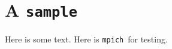 \documentclass{article}
\def\MPI/{MPI}
\def\mpich{{\tt mpich}}
\begin{document}
\section{A {\tt sample}}\label{Sample-doc}

Here is some text.  Here is \mpich\ for testing.
%
%
%
\end{document}
